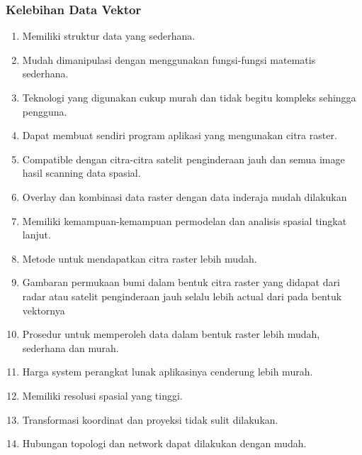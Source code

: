 \begin{enumerate}
\subsubsection{Kelebihan Data Vektor}
\begin{enumerate}
Kelebihan data vektor di bandingkan data raster
data vektor relatif lebih ekonomis dalam hal ukuran file dan presisi dalam lokasi, tetapi sangat sulit untuk digunakan dalam komputasi matematik. 
\item Memiliki struktur data yang sederhana.
\item Mudah dimanipulasi dengan menggunakan fungsi-fungsi matematis sederhana.
\item Teknologi yang digunakan cukup murah dan tidak begitu kompleks sehingga pengguna.
\item Dapat membuat sendiri program aplikasi yang mengunakan citra raster.
\item Compatible dengan citra-citra satelit penginderaan jauh dan semua image hasil scanning data spasial.
\item Overlay dan kombinasi data raster dengan data inderaja mudah dilakukan
\item Memiliki kemampuan-kemampuan permodelan dan analisis spasial tingkat lanjut.
\item Metode untuk mendapatkan citra raster lebih mudah.
\item Gambaran permukaan bumi dalam bentuk citra raster yang didapat dari radar atau satelit penginderaan jauh selalu lebih actual dari pada bentuk vektornya
\item Prosedur untuk memperoleh data dalam bentuk raster lebih mudah, sederhana dan murah.
\item Harga system perangkat lunak aplikasinya cenderung lebih murah.
\item Memiliki resolusi spasial yang tinggi.
\item Transformasi koordinat dan proyeksi tidak sulit dilakukan.
\item Hubungan topologi dan network dapat dilakukan dengan mudah.
\end{enumerate}


\end{enumerate}
